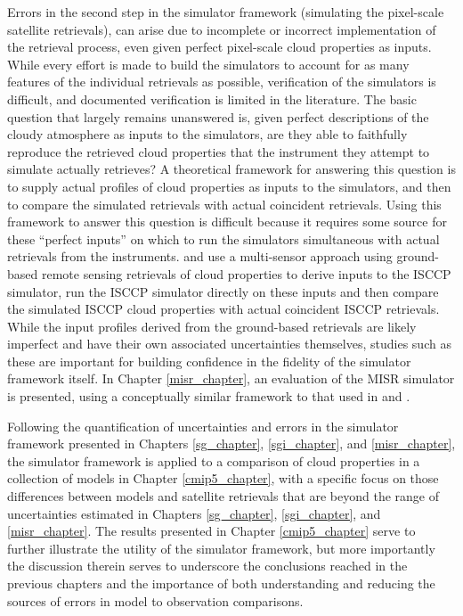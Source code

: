 Errors in the second step in the simulator framework (simulating the pixel-scale satellite retrievals), can arise due to incomplete or incorrect implementation of the retrieval process, even given perfect pixel-scale cloud properties as inputs. While every effort is made to build the simulators to account for as many features of the individual retrievals as possible, verification of the simulators is difficult, and documented verification is limited in the literature. The basic question that largely remains unanswered is, given perfect descriptions of the cloudy atmosphere as inputs to the simulators, are they able to faithfully reproduce the retrieved cloud properties that the instrument they attempt to simulate actually retrieves? A theoretical framework for answering this question is to supply actual profiles of cloud properties as inputs to the simulators, and then to compare the simulated retrievals with actual coincident retrievals. Using this framework to answer this question is difficult because it requires some source for these ``perfect inputs'' on which to run the simulators simultaneous with actual retrievals from the instruments. \cite{mace_et_al_2009} and \cite{mace_et_al_2011} use a multi-sensor approach using ground-based remote sensing retrievals of cloud properties to derive inputs to the ISCCP simulator, run the ISCCP simulator directly on these inputs and then compare the simulated ISCCP cloud properties with actual coincident ISCCP retrievals. While the input profiles derived from the ground-based retrievals are likely imperfect and have their own associated uncertainties themselves, studies such as these are important for building confidence in the fidelity of the simulator framework itself. In Chapter \ref{misr_chapter}, an evaluation of the MISR simulator is presented, using a conceptually similar framework to that used in \cite{mace_et_al_2009} and \cite{mace_et_al_2011}.

Following the quantification of uncertainties and errors in the simulator framework presented in Chapters \ref{sg_chapter}, \ref{sgi_chapter}, and \ref{misr_chapter}, the simulator framework is applied to a comparison of cloud properties in a collection of models in Chapter \ref{cmip5_chapter}, with a specific focus on those differences between models and satellite retrievals that are beyond the range of uncertainties estimated in Chapters \ref{sg_chapter}, \ref{sgi_chapter}, and \ref{misr_chapter}. The results presented in Chapter \ref{cmip5_chapter} serve to further illustrate the utility of the simulator framework, but more importantly the discussion therein serves to underscore the conclusions reached in the previous chapters and the importance of both understanding and reducing the sources of errors in model to observation comparisons.
